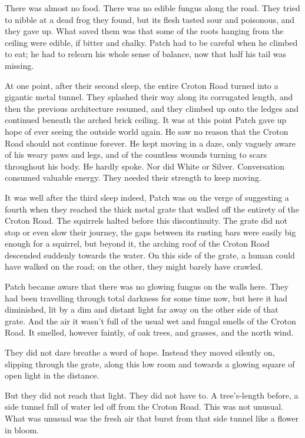 \documentclass[12pt]{book}
\begin{document}
There was almost no food. There was no edible fungus along the road. They tried to nibble at a dead frog they found, but its flesh tasted sour and poisonous, and they gave up. What saved them was that some of the roots hanging from the ceiling were edible, if bitter and chalky. Patch had to be careful when he climbed to eat; he had to relearn his whole sense of balance, now that half his tail was missing.\par
 At one point, after their second sleep, the entire Croton Road turned into a gigantic metal tunnel. They splashed their way along its corrugated length, and then the previous architecture resumed, and they climbed up onto the ledges and continued beneath the arched brick ceiling. It was at this point Patch gave up hope of ever seeing the outside world again. He saw no reason that the Croton Road should not continue forever. He kept moving in a daze, only vaguely aware of his weary paws and legs, and of the countless wounds turning to scars throughout his body. He hardly spoke. Nor did White or Silver. Conversation consumed valuable energy. They needed their strength to keep moving.\par
 It was well after the third sleep %
 indeed, Patch was on the verge of suggesting a fourth %
 when they reached the thick metal grate that walled off the entirety of the Croton Road. The squirrels halted before this discontinuity. The grate did not stop or even slow their journey, the gaps between its rusting bars were easily big enough for a squirrel, but beyond it, the arching roof of the Croton Road descended suddenly towards the water. On this side of the grate, a human could have walked on the road; on the other, they might barely have crawled.\par
 Patch became aware that there was no glowing fungus on the walls here. They had been travelling through total darkness for some time now, but here it had diminished, lit by a dim and distant light far away on the other side of that grate. And the air %
 it wasn't full of the usual wet and fungal smells of the Croton Road. It smelled, however faintly, of oak trees, and grasses, and the north wind.\par
 They did not dare breathe a word of hope. Instead they moved silently on, slipping through the grate, along this low room %
 and towards a glowing square of open light in the distance.\par
But they did not reach that light. They did not have to. A tree's-length before, a side tunnel full of water led off from the Croton Road. This was not unusual. What was unusual was the fresh air that burst from that side tunnel like a flower in bloom.\par
\end{document}
